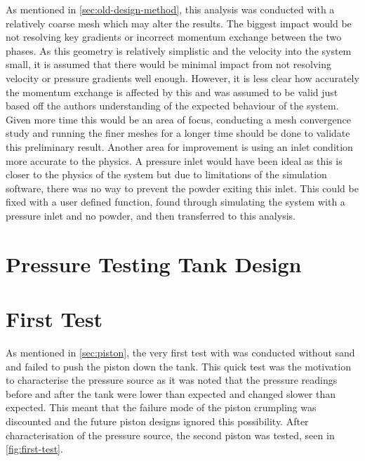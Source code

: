 As mentioned in \autoref{sec:old-design-method}, this analysis was conducted with a relatively coarse mesh which may alter the results. The biggest impact would be not resolving key gradients or incorrect momentum exchange between the two phases. As this geometry is relatively simplistic and the velocity into the system small, it is assumed that there would be minimal impact from not resolving velocity or pressure gradients well enough. However, it is less clear how accurately the momentum exchange is affected by this and was assumed to be valid just based off the authors understanding of the expected behaviour of the system. Given more time this would be an area of focus, conducting a mesh convergence study and running the finer meshes for a longer time should be done to validate this preliminary result. Another area for improvement is using an inlet condition more accurate to the physics. A pressure inlet would have been ideal as this is closer to the physics of the system but due to limitations of the simulation software, there was no way to prevent the powder exiting this inlet. This could be fixed with a user defined function, found through simulating the system with a pressure inlet and no powder, and then transferred to this analysis.

\section{Pressure Testing Tank Design}

\section{First Test}\label{sec:first-test}
As mentioned in \autoref{sec:piston}, the very first test with was conducted without sand and failed to push the piston down the tank. This quick test was the motivation to characterise the pressure source as it was noted that the pressure readings before and after the tank were lower than expected and changed slower than expected. This meant that the failure mode of the piston crumpling was discounted and the future piston designs ignored this possibility. After characterisation of the pressure source, the second piston was tested, seen in \autoref{fig:first-test}. 

